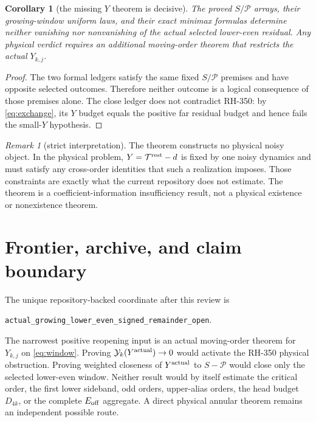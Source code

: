 \documentclass[11pt]{article}
\newtheorem{corollary}[theorem]{Corollary}
\theoremstyle{definition}
\theoremstyle{remark}
\newtheorem{remark}[theorem]{Remark}
\newcommand{\cP}{\mathcal P}
\newcommand{\cT}{\mathcal T}
\newcommand{\cY}{\mathcal Y}
\begin{document}
\begin{corollary}[the missing $Y$ theorem is decisive]
The proved $S/\cP$ arrays, their growing-window uniform laws, and their exact
minimax formulas determine neither vanishing nor nonvanishing of the actual
selected lower-even residual.  Any physical verdict requires an additional
moving-order theorem that restricts the actual $Y_{k,j}$.
\end{corollary}

\begin{proof}
The two formal ledgers satisfy the same fixed $S/\cP$ premises and have
opposite selected outcomes.  Therefore neither outcome is a logical
consequence of those premises alone.  The close ledger does not contradict
RH-350: by \eqref{eq:exchange}, its $Y$ budget equals the positive far
residual budget and hence fails the small-$Y$ hypothesis.
\end{proof}

\begin{remark}[strict interpretation]
The theorem constructs no physical noisy object.  In the physical problem,
$Y=\cT^{\rm rest}-d$ is fixed by one noisy dynamics and must satisfy any
cross-order identities that such a realization imposes.  Those constraints
are exactly what the current repository does not estimate.  The theorem is
a coefficient-information insufficiency result, not a physical existence or
nonexistence theorem.
\end{remark}

\section{Frontier, archive, and claim boundary}

The unique repository-backed coordinate after this review is
\begin{center}
\texttt{actual\_growing\_lower\_even\_signed\_remainder\_open}.
\end{center}
The narrowest positive reopening input is an actual moving-order theorem for
$Y_{k,j}$ on \eqref{eq:window}.  Proving $\cY_k(Y^{\rm actual})\to0$ would
activate the RH-350 physical obstruction.  Proving weighted closeness of
$Y^{\rm actual}$ to $S-\cP$ would close only the selected lower-even window.
Neither result would by itself estimate the critical order, the first lower
sideband, odd orders, upper-alias orders, the head budget $D_{4k}$, or the
complete $E_{\rm off}$ aggregate.  A direct physical annular theorem remains
an independent possible route.
\end{document}
